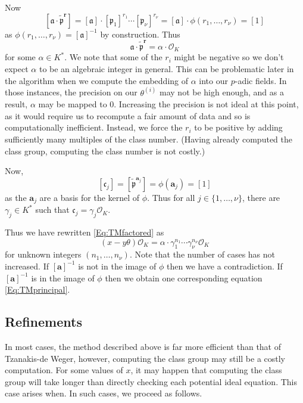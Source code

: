 Now
\[[\mathfrak{a} \cdot \tilde{\mathfrak{p}}^\mathbf{r}] 
	= [\mathfrak{a}] \cdot [\mathfrak{p}_1]^{r_1}\cdots [\mathfrak{p}_{\nu}]^{r_{\nu}} 
	= [\mathfrak{a}]\cdot \phi(r_1,\dotsc,r_{\nu})=[1]\]
as $\phi(r_1,\dotsc,r_{\nu})=[\mathfrak{a}]^{-1}$ by construction. Thus 
\[\mathfrak{a} \cdot \tilde{\mathfrak{p}}^\mathbf{r}=\alpha \cdot \mathcal{O}_K\]
for some $\alpha \in K^*$. We note that some of the $r_i$ might be negative so we don't expect $\alpha$ to be an algebraic integer in general. This can be problematic later in the algorithm when we compute the embedding of $\alpha$ into our $p$-adic fields. In those instances, the precision on our $\theta^{(i)}$ may not be high enough, and as a result, $\alpha$ may be mapped to $0$. Increasing the precision is not ideal at this point, as it would require us to recompute a fair amount of data and so is computationally inefficient. Instead, we force the $r_i$ to be positive by adding sufficiently many multiples of the class number. (Having already computed the class group, computing the class number is not costly.)

Now, 
\[[\mathfrak{c}_j] = [\tilde{\mathfrak{p}}^{\mathbf{a}_j}] = \phi(\mathbf{a}_j) = [1]\]
as the $\mathbf{a}_j$ are a basis for the kernel of $\phi$. Thus for all $j \in \{1, \dots, {\nu}\}$, there are $\gamma_j \in K^*$ such that $\mathfrak{c}_j=\gamma_j \mathcal{O}_K$. 

Thus we have rewritten \eqref{Eq:TMfactored} as
\begin{equation}\label{Eq:TMprincipal}
(x-y\theta) \mathcal{O}_K=\alpha \cdot \gamma_1^{n_1} \cdots \gamma_{\nu}^{n_{\nu}} \mathcal{O}_K
\end{equation}
for unknown integers $(n_1, \dots, n_{\nu})$. 
Note that the number of cases has not increased. If $[\mathbf{a}]^{-1}$ is not in the image of $\phi$ then we have a contradiction. If $[\mathbf{a}]^{-1}$ is in the image of $\phi$ then we obtain one corresponding equation \eqref{Eq:TMprincipal}.

\subsection{Refinements}
In most cases, the method described above is far more efficient than that of Tzanakis-de Weger, however, computing the class group may still be a costly computation. For some values of $x$, it may happen that computing the class group will take longer than directly checking each potential ideal equation. This case arises when. In such cases, we proceed as follows.

